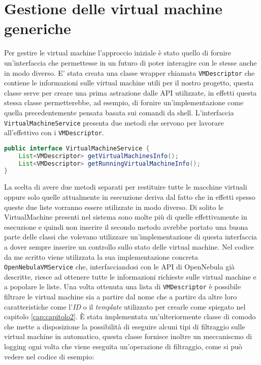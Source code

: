 \section{Gestione delle virtual machine generiche}
Per gestire le virtual machine l'approccio iniziale è stato quello di fornire un'interfaccia che permettesse in un futuro di poter interagire con le stesse anche in modo diverso.
E' stata creata una classe wrapper chiamata \texttt{VMDescriptor} che contiene le informazioni sulle virtual machine utili per il nostro progetto, questa classe serve per creare una prima astrazione dalle API utilizzate, in effetti questa stessa classe permetterebbe, ad esempio, di fornire un'implementazione come quella precedentemente pensata basata sui comandi da shell.
L'interfaccia \texttt{VirtualMachineService} presenta due metodi che servono per lavorare all'effettivo con i \texttt{VMDescriptor}.
\begin{lstlisting}[language=Java, caption=VirtualMachineService, label=code:VirtualMachineService, xleftmargin=1em]
public interface VirtualMachineService {
    List<VMDescriptor> getVirtualMachinesInfo();
    List<VMDescriptor> getRunningVirtualMachineInfo();
}
\end{lstlisting}
La scelta di avere due metodi separati per restituire tutte le macchine virtuali oppure solo quelle attualmente in esecuzione deriva dal fatto che in effetti spesso queste due liste vorranno essere utilizzate in modo diverso. Di solito le VirtualMachine presenti nel sistema sono molte più di quelle effettivamente in esecuzione e quindi non inserire il secondo metodo avrebbe portato una buona parte delle classi che volevano utilizzare un'implementazione di questa interfaccia a dover sempre inserire un controllo sullo stato delle virtual machine.
Nel codice da me scritto viene utilizzata la sua implementazione concreta \texttt{OpenNebulaVMService} che, interfacciandosi con le API di OpenNebula già descritte, riesce ad ottenere tutte le informazioni richieste sulle virtual machine e a popolare le liste.
Una volta ottenuta una lista di \texttt{VMDescriptor} è possibile filtrare le virtual machine sia a partire dal nome che a partire da altre loro caratteristiche come l'\emph{ID} o il \emph{template} utilizzato per crearle come spiegato nel capitolo \ref{cap:capitolo2}.
È stata implementata un'ulteriormente classe di comodo che mette a disposizione la possibilità di eseguire alcuni tipi di filtraggio sulle virtual machine in automatico, questa classe fornisce inoltre un meccaniscmo di logging ogni volta che viene eseguita un'operazione di filtraggio, come si può vedere nel codice di esempio:
